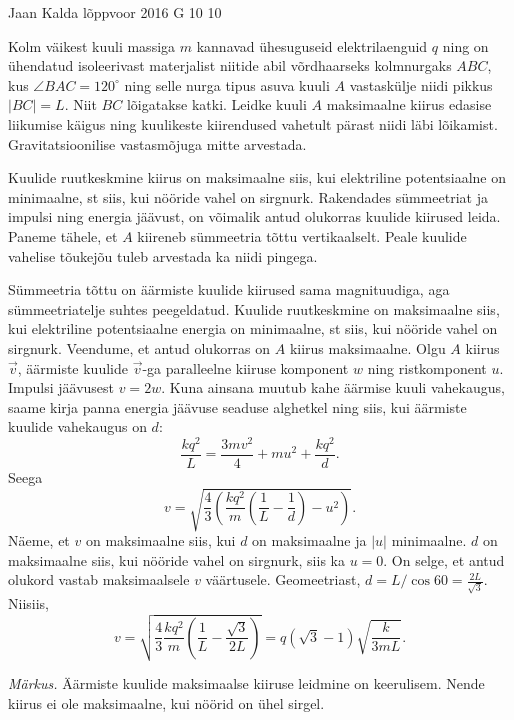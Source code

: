 {Jaan Kalda} %
{lõppvoor} %
{2016} %
{G 10} %
{10} %
{
\ifStatement
Kolm väikest kuuli massiga $m$ kannavad ühesuguseid elektrilaenguid $q$ ning on ühendatud isoleerivast materjalist niitide abil võrdhaarseks kolmnurgaks $ABC$, kus $\angle BAC=120^\circ$ ning selle nurga tipus asuva kuuli $A$ vastaskülje niidi pikkus $|BC|=L$. Niit $BC$ lõigatakse katki. Leidke \osa kuuli $A$ maksimaalne kiirus edasise liikumise käigus ning \osa kuulikeste kiirendused vahetult pärast niidi läbi lõikamist. Gravitatsioonilise vastasmõjuga mitte arvestada.
\fi


\ifHint
\osa Kuulide ruutkeskmine kiirus on maksimaalne siis, kui elektriline potentsiaalne on minimaalne, st siis, kui nööride vahel on sirgnurk. Rakendades sümmeetriat ja impulsi ning energia jäävust, on võimalik antud olukorras kuulide kiirused leida.\\
\osa Paneme tähele, et $A$ kiireneb sümmeetria tõttu vertikaalselt. Peale kuulide vahelise tõukejõu tuleb arvestada ka niidi pingega.
\fi


\ifSolution
\osa Sümmeetria tõttu on äärmiste kuulide kiirused sama magnituudiga, aga sümmeetriatelje suhtes peegeldatud.
Kuulide ruutkeskmine on maksimaalne siis, kui elektriline potentsiaalne energia on minimaalne, st siis, kui nööride vahel on sirgnurk. Veendume, et antud olukorras on $A$ kiirus maksimaalne. Olgu $A$ kiirus $\vec v$, äärmiste kuulide $\vec v$-ga paralleelne kiiruse komponent $w$ ning ristkomponent $u$. Impulsi jäävusest $v = 2w$.
Kuna ainsana muutub kahe äärmise kuuli vahekaugus, saame kirja panna energia jäävuse seaduse alghetkel ning siis, kui äärmiste kuulide vahekaugus on $d$:
\[
\frac{kq^2}{L} = \frac{3mv^2}{4} + mu^2 + \frac{kq^2}{d}.
\]
Seega
\[
v = \sqrt{\frac{4}{3}\left(\frac{kq^2}{m}\left(\frac{1}{L} - \frac{1}{d}\right) - u^2\right)}.
\]
Näeme, et $v$ on maksimaalne siis, kui $d$ on maksimaalne ja $|u|$  minimaalne. $d$ on maksimaalne siis, kui nööride vahel on sirgnurk, siis ka $u = 0$. On selge, et antud olukord vastab maksimaalsele $v$ väärtusele. Geomeetriast, $d = L/\cos 60 = \frac{2L}{\sqrt 3}$. Niisiis,
\[
v = \sqrt{\frac{4}{3}\frac{kq^2}{m}\left(\frac{1}{L}-\frac{\sqrt{3}}{2L}\right)} = q\left(\sqrt{3} - 1\right)\sqrt{\frac{k}{3mL}}.
\]

\emph{Märkus.} Äärmiste kuulide maksimaalse kiiruse leidmine on keerulisem. Nende kiirus ei ole maksimaalne, kui nöörid on ühel sirgel.

}
